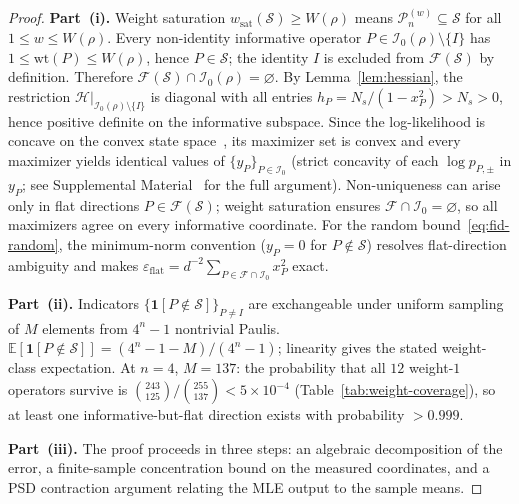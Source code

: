 \documentclass[twocolumn,prx,aps,superscriptaddress,longbibliography,floatfix]{revtex4-2}
\begin{document}
\begin{proof}
\textbf{Part~(i).}
Weight saturation $w_{\mathrm{sat}}(\mathcal{S}) \ge W(\rho)$ means
$\mathcal{P}_n^{(w)} \subseteq \mathcal{S}$ for all $1 \le w \le W(\rho)$.
Every non-identity informative operator $P \in \mathcal{I}_0(\rho)
\setminus \{I\}$ has $1 \le \mathrm{wt}(P) \le W(\rho)$, hence
$P \in \mathcal{S}$; the identity $I$ is excluded from
$\mathcal{F}(\mathcal{S})$ by definition.
Therefore $\mathcal{F}(\mathcal{S}) \cap \mathcal{I}_0(\rho) = \varnothing$.
By Lemma~\ref{lem:hessian}, the restriction
$\mathcal{H}\big|_{\mathcal{I}_0(\rho) \setminus \{I\}}$ is diagonal
with all entries $h_P = N_s/(1 - x_P^2) > N_s > 0$,
hence positive definite on the informative subspace.
Since the log-likelihood is concave on the convex state
space~\cite{Blume-Kohout2010}, its maximizer set is convex
and every maximizer yields identical values of
$\{y_P\}_{P \in \mathcal{I}_0}$
(strict concavity of each $\log p_{P,\pm}$ in $y_P$;
see Supplemental Material~\cite{supplemental} for the
full argument).
Non-uniqueness can arise only in flat directions
$P \in \mathcal{F}(\mathcal{S})$; weight saturation ensures
$\mathcal{F} \cap \mathcal{I}_0 = \varnothing$,
so all maximizers agree on every informative coordinate.
For the random bound~\eqref{eq:fid-random}, the minimum-norm
convention ($y_P = 0$ for $P \notin \mathcal{S}$) resolves
flat-direction ambiguity and makes
$\varepsilon_{\mathrm{flat}} = d^{-2}\sum_{P \in \mathcal{F}
\cap \mathcal{I}_0} x_P^2$ exact.

\medskip\noindent
\textbf{Part~(ii).}
Indicators $\{\mathbf{1}[P \notin \mathcal{S}]\}_{P \neq I}$ are
exchangeable under uniform sampling of $M$ elements from $4^n - 1$
nontrivial Paulis.
$\mathbb{E}[\mathbf{1}[P \notin \mathcal{S}]] = (4^n{-}1{-}M)/(4^n{-}1)$;
linearity gives the stated weight-class expectation.
At $n = 4$, $M = 137$: the probability that all $12$ weight-$1$
operators survive is $\binom{243}{125}/\binom{255}{137}
< 5 \times 10^{-4}$ (Table~\ref{tab:weight-coverage}),
so at least one informative-but-flat direction exists with
probability $> 0.999$.

\medskip\noindent
\textbf{Part~(iii).}
The proof proceeds in three steps: an algebraic decomposition
of the error, a finite-sample concentration bound on the
measured coordinates, and a PSD contraction argument relating
the MLE output to the sample means.


\end{proof}
\end{document}
